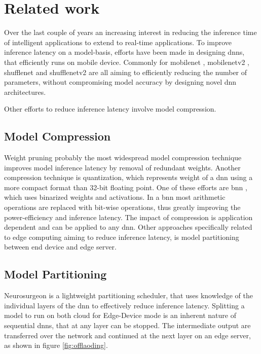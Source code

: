 \section{Related work}

Over the last couple of years an increasing interest in reducing the inference time of intelligent applications to extend to real-time applications. To improve inference latency on a model-basis, efforts have been made in designing \gls{dnn}s, that efficiently runs on mobile device. Commonly for \gls{mobilenet} \cite{howard_mobilenets:_2017}, \gls{mobilenetv2} \cite{sandler_mobilenetv2:_2018}, \gls{shufflenet} \cite{zhang_shufflenet:_2017} and \gls{shufflenetv2} \cite{ma_shufflenet_2018} are all aiming to efficiently reducing the number of parameters, without compromising model accuracy by designing novel \gls{dnn} architectures.   

Other efforts to reduce inference latency involve model compression. 

\subsection{Model Compression}

Weight pruning probably the most widespread model compression technique improves model inference latency by removal of redundant weights. Another compression technique is quantization, which represents weight of a \gls{dnn} using a more compact format than 32-bit floating point. One of these efforts are \gls{bnn} \cite{courbariaux_binarized_2016}, which uses binarized weights and activations. In a \gls{bnn} most arithmetic operations are replaced with bit-wise operations, thus greatly improving the power-efficiency and inference latency. The impact of compression is application dependent and can be applied to any \gls{dnn}. Other approaches specifically related to edge computing aiming to reduce inference latency, is model partitioning between end device and edge server. 

\subsection{Model Partitioning}

Neurosurgeon \cite{kang_neurosurgeon:_2017} is a lightweight partitioning scheduler, that uses knowledge of the individual layers of the \gls{dnn} to effectively reduce inference latency. Splitting a model to run on both cloud for Edge-Device mode is an inherent nature of sequential \gls{dnn}s, that at any layer can be stopped. The intermediate output are transferred over the network and continued at the next layer on an edge server, as shown in figure \ref{fig:offlaoding}.

